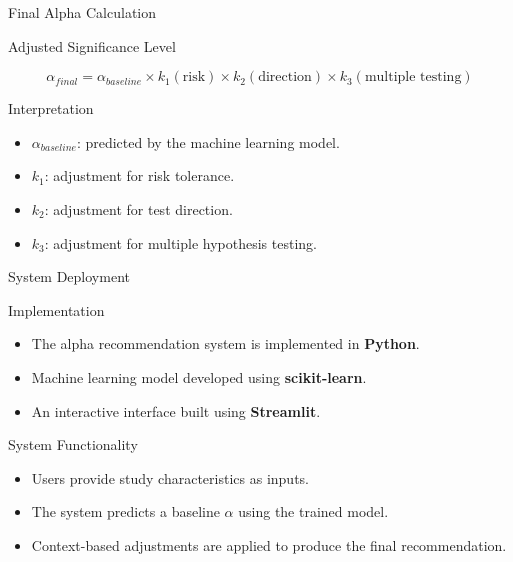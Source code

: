 \begin{frame}{Final Alpha Calculation}
	
	\begin{block}{Adjusted Significance Level}
		
		\[
		\alpha_{final}
		=
		\alpha_{baseline}
		\times
		k_1(\text{risk})
		\times
		k_2(\text{direction})
		\times
		k_3(\text{multiple testing})
		\]
		
	\end{block}
	
	\vspace{0.5cm}
	
	\begin{exampleblock}{Interpretation}
		
		\begin{itemize}
			\item $\alpha_{baseline}$: predicted by the machine learning model.
			\item $k_1$: adjustment for risk tolerance.
			\item $k_2$: adjustment for test direction.
			\item $k_3$: adjustment for multiple hypothesis testing.
		\end{itemize}
		
	\end{exampleblock}
	
\end{frame}

\begin{frame}{System Deployment}
	
	\begin{block}{Implementation}
		
		\begin{itemize}
			\item The alpha recommendation system is implemented in \textbf{Python}.
			\item Machine learning model developed using \textbf{scikit-learn}.
			\item An interactive interface built using \textbf{Streamlit}.
		\end{itemize}
		
	\end{block}
	
	\vspace{0.4cm}
	
	\begin{exampleblock}{System Functionality}
		
		\begin{itemize}
			\item Users provide study characteristics as inputs.
			\item The system predicts a baseline $\alpha$ using the trained model.
			\item Context-based adjustments are applied to produce the final recommendation.
		\end{itemize}
		
	\end{exampleblock}
	
\end{frame}
